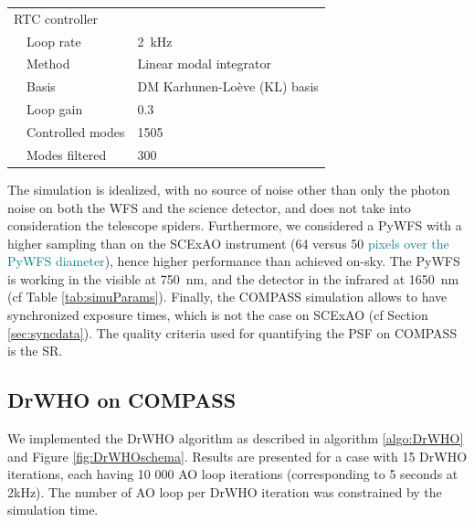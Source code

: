 \documentclass[twocolumn]{aa}
\newcommand{\nour}[1]{\textcolor{teal}{#1}}
\begin{document}
\begin{table}[t]
\begin{tabular}{ll}
			\hline
			RTC controller & \\
			$\quad$Loop rate & 2~kHz\\
			$\quad$Method & Linear modal integrator\\
			$\quad$Basis & DM Karhunen-Loève (KL) basis\tablefootmark{(a)} \\
			$\quad$Loop gain & 0.3\\
			$\quad$Controlled modes & 1505\\
			$\quad$Modes filtered & 300\\
			\hline
		\end{tabular}
	\end{table}

The simulation is idealized, with no source of noise other than only the photon noise on both the WFS and the science detector, and does not take into consideration the telescope spiders. Furthermore, we considered a PyWFS with a higher sampling than on the SCExAO instrument (64 versus 50 \nour{pixels over the PyWFS diameter}), hence higher performance than achieved on-sky. The PyWFS is working in the visible at 750~nm, and the detector in the infrared at 1650~nm (cf Table \ref{tab:simuParams}). Finally, the COMPASS simulation allows to have synchronized exposure times, which is not the case on SCExAO (cf Section \ref{sec:syncdata}).  
The quality criteria used for quantifying the PSF on COMPASS is the SR. 


\subsection{DrWHO on COMPASS}
We implemented the DrWHO algorithm as described in algorithm \ref{algo:DrWHO} and Figure \ref{fig:DrWHOschema}. Results are presented for a case with 15 DrWHO iterations, each having 10 000 AO loop iterations (corresponding to 5 seconds at 2kHz). The number of AO loop per DrWHO iteration was constrained by the simulation time. 
\end{document}
